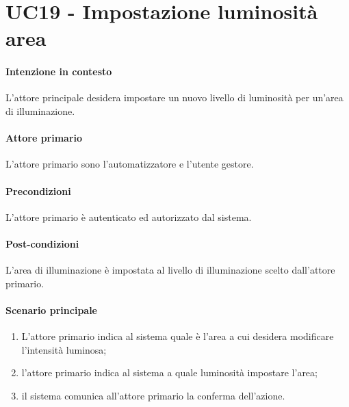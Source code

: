 \section{UC19 - Impostazione luminosità area}\label{uc:19}
\paragraph{Intenzione in contesto} L'attore principale desidera impostare un nuovo livello di luminosità per un'area di illuminazione.
\paragraph{Attore primario} L'attore primario sono l'automatizzatore e l'utente gestore.
\paragraph{Precondizioni} L'attore primario è autenticato ed autorizzato dal sistema.
\paragraph{Post-condizioni} L'area di illuminazione è impostata al livello di illuminazione scelto dall'attore primario.
\paragraph{Scenario principale}
\begin{enumerate}
    \item L'attore primario indica al sistema quale è l'area a cui desidera modificare l'intensità luminosa;
    \item l'attore primario indica al sistema a quale luminosità impostare l'area;
    \item il sistema comunica all'attore primario la conferma dell'azione.
\end{enumerate}